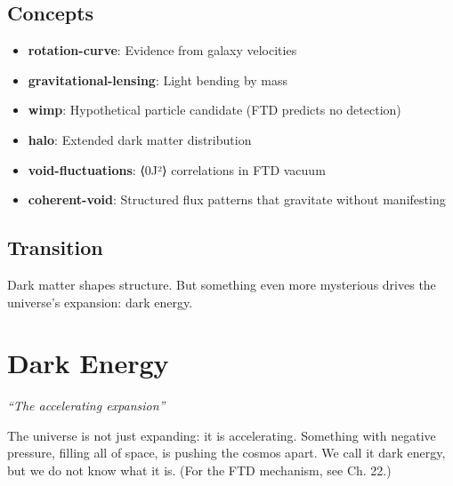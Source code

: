 \documentclass[
  11pt,
  letterpaper,
  twoside,
  openright]{book}
\providecommand{\tightlist}{%
  \setlength{\itemsep}{0pt}\setlength{\parskip}{0pt}}
\begin{document}
\section{Concepts}\label{concepts-29}

\begin{itemize}
\tightlist
\item
  \textbf{rotation-curve}: Evidence from galaxy velocities
\item
  \textbf{gravitational-lensing}: Light bending by mass
\item
  \textbf{wimp}: Hypothetical particle candidate (FTD predicts no
  detection)
\item
  \textbf{halo}: Extended dark matter distribution
\item
  \textbf{void-fluctuations}: ⟨0\textbar J²⟩ correlations in
  FTD vacuum
\item
  \textbf{coherent-void}: Structured flux patterns that gravitate
  without manifesting
\end{itemize}

\section{Transition}\label{transition-29}

Dark matter shapes structure. But something even more mysterious drives
the universe's expansion: dark energy.

\chapter{Dark Energy}\label{sec-dark-energy}

\emph{``The accelerating expansion''}

\begin{tcolorbox}[enhanced jigsaw, leftrule=.75mm, title=\textcolor{quarto-callout-note-color}{\faInfo}\hspace{0.5em}{Key Revelation}, bottomrule=.15mm, opacityback=0, coltitle=black, arc=.35mm, colframe=quarto-callout-note-color-frame, colbacktitle=quarto-callout-note-color!10!white, colback=white, titlerule=0mm, breakable, bottomtitle=1mm, toptitle=1mm, rightrule=.15mm, toprule=.15mm, left=2mm, opacitybacktitle=0.6]

The universe is not just expanding: it is accelerating. Something with
negative pressure, filling all of space, is pushing the cosmos apart. We
call it dark energy, but we do not know what it is. (For the FTD
mechanism, see Ch. 22.)

\end{tcolorbox}
\end{document}
